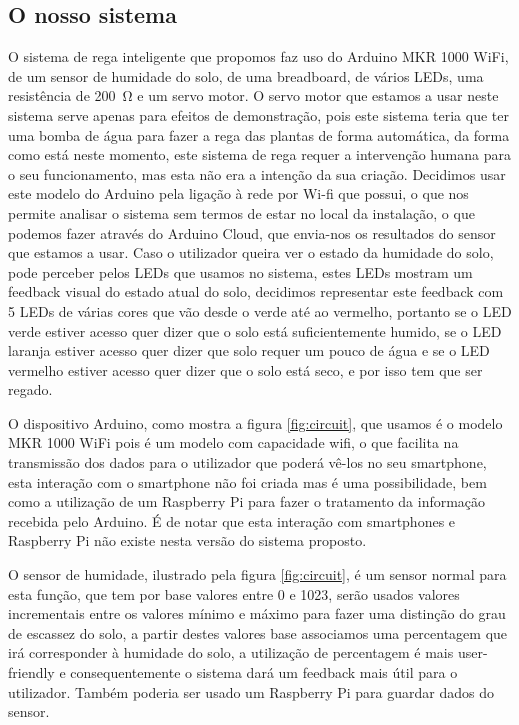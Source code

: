 \documentclass[conference]{IEEEtran}
\begin{document}
\subsection{O nosso sistema}

O sistema de rega inteligente que propomos faz uso do Arduino MKR 1000 WiFi, 
de um sensor de humidade do solo, de uma breadboard, de vários LEDs, uma 
resistência de \SI{200}{\ohm} e um servo motor. O servo motor que estamos a 
usar neste sistema serve apenas para efeitos de demonstração, pois 
este sistema teria que ter uma bomba de água para fazer a rega 
das plantas de forma automática, da forma como está neste momento, este 
sistema de rega requer a intervenção humana para o seu funcionamento, mas 
esta não era a intenção da sua criação.
Decidimos usar este modelo do Arduino pela ligação 
à rede por Wi-fi que possui, o que nos permite analisar o sistema sem termos de 
estar no local da instalação, o que podemos fazer através do Arduino Cloud, 
que envia-nos os resultados do sensor que estamos a usar. Caso o utilizador 
queira ver o estado da humidade do solo, pode perceber pelos LEDs que usamos no sistema, 
estes LEDs mostram um feedback visual do estado atual do solo, decidimos representar este 
feedback com 5 LEDs de várias cores que vão desde o verde até ao vermelho, portanto 
se o LED verde estiver acesso quer dizer que o solo está suficientemente humido, se 
o LED laranja estiver acesso quer dizer que solo requer um pouco de água e se o LED
vermelho estiver acesso quer dizer que o solo está seco, e por isso tem que ser regado.

O dispositivo Arduino, como mostra a figura \ref{fig:circuit}, que usamos é o 
modelo MKR 1000 WiFi pois é um modelo com capacidade wifi, o que facilita na 
transmissão dos dados para o utilizador que poderá vê-los no seu smartphone, 
esta interação com o smartphone não foi criada mas é uma possibilidade, bem 
como a utilização de um Raspberry Pi para fazer o tratamento da informação 
recebida pelo Arduino. É de notar que esta interação com smartphones e 
Raspberry Pi não existe nesta versão do sistema proposto.

O sensor de humidade, ilustrado pela figura \ref{fig:circuit}, é um 
sensor normal para esta função, que tem por base valores entre 0 e 1023, serão usados valores 
incrementais entre os valores mínimo e máximo para fazer uma distinção do grau 
de escassez do solo, a partir destes valores base associamos uma percentagem 
que irá corresponder à humidade do solo, a utilização de percentagem é 
mais user-friendly e consequentemente o sistema dará um feedback mais útil
para o utilizador. Também poderia ser usado um Raspberry Pi para guardar dados do sensor.
\end{document}
